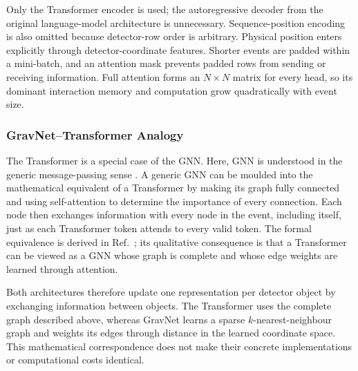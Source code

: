 

Only the Transformer encoder is used; the autoregressive decoder from the
original language-model architecture is unnecessary. Sequence-position
encoding is also omitted because detector-row order is arbitrary. Physical
position enters explicitly through detector-coordinate features. Shorter
events are padded within a mini-batch, and an attention mask prevents padded
rows from sending or receiving information. Full attention forms an
\(N\times N\) matrix for every head, so its dominant interaction memory and
computation grow quadratically with event size.


\subsubsection{GravNet--Transformer Analogy}
\label{sec:gravnet_transformer_comparison}

The Transformer is a special case of the GNN. Here, GNN is understood in the
generic message-passing sense \cite{joshi2025transformersgnn}. A generic
GNN can be moulded into the mathematical equivalent of a Transformer by making
its graph fully connected and using self-attention to determine the importance
of every connection. Each node then exchanges information with every node in
the event, including itself, just as each Transformer token attends to every
valid token. The formal equivalence is derived in
Ref.~\cite{joshi2025transformersgnn}; its qualitative consequence is that a
Transformer can be viewed as a GNN whose graph is complete and whose edge
weights are learned through attention.

Both architectures therefore update one representation per detector object by
exchanging information between objects. The Transformer uses the complete
graph described above, whereas GravNet learns a sparse \(k\)-nearest-neighbour
graph and weights its edges through distance in the learned coordinate space.
This mathematical correspondence does not make their concrete implementations
or computational costs identical.

